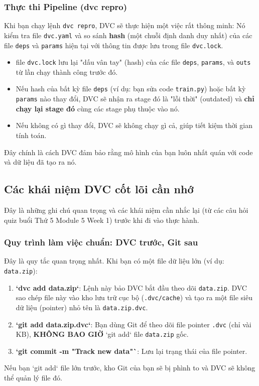 \documentclass[11pt]{article}
\begin{document}
\subsubsection{Thực thi Pipeline (dvc repro)}
Khi bạn chạy lệnh \texttt{dvc repro}, DVC sẽ thực hiện một việc rất thông minh:
Nó kiểm tra file \texttt{dvc.yaml} và so sánh \textbf{hash} (một chuỗi định danh duy nhất) của các file \texttt{deps} và \texttt{params} hiện tại với thông tin được lưu trong file \texttt{dvc.lock}.

\begin{itemize}
    \item file \texttt{dvc.lock} lưu lại "dấu vân tay" (hash) của các file \texttt{deps}, \texttt{params}, và \texttt{outs} từ lần chạy thành công trước đó.
    \item Nếu hash của bất kỳ file \texttt{deps} (ví dụ: bạn sửa code \texttt{train.py}) hoặc bất kỳ \texttt{params} nào thay đổi, DVC sẽ nhận ra stage đó là "lỗi thời" (outdated) và \textbf{chỉ chạy lại stage đó} cùng các stage phụ thuộc vào nó.
    \item Nếu không có gì thay đổi, DVC sẽ không chạy gì cả, giúp tiết kiệm thời gian tính toán.
\end{itemize}
Đây chính là cách DVC đảm bảo rằng mô hình của bạn luôn nhất quán với code và dữ liệu đã tạo ra nó.

\subsection{Các khái niệm DVC cốt lõi cần nhớ}
Đây là những ghi chú quan trọng và các khái niệm cần nhắc lại (từ các câu hỏi quiz buổi Thứ 5 Module 5 Week 1) trước khi đi vào thực hành.

\subsubsection{Quy trình làm việc chuẩn: DVC trước, Git sau}
Đây là quy tắc quan trọng nhất. Khi bạn có một file dữ liệu lớn (ví dụ: \texttt{data.zip}):
\begin{enumerate}
    \item \textbf{`dvc add data.zip`}: Lệnh này bảo DVC bắt đầu theo dõi \texttt{data.zip}. DVC sao chép file này vào kho lưu trữ cục bộ (\texttt{.dvc/cache}) và tạo ra một file siêu dữ liệu (pointer) nhỏ tên là \texttt{data.zip.dvc}.
    \item \textbf{`git add data.zip.dvc`}: Bạn dùng Git để theo dõi file pointer \texttt{.dvc} (chỉ vài KB), \textbf{KHÔNG BAO GIỜ} `git add` file \texttt{data.zip} gốc.
    \item \textbf{`git commit -m "Track new data"`}: Lưu lại trạng thái của file pointer.
\end{enumerate}
Nếu bạn `git add` file lớn trước, kho Git của bạn sẽ bị phình to và DVC sẽ không thể quản lý file đó.
\end{document}

